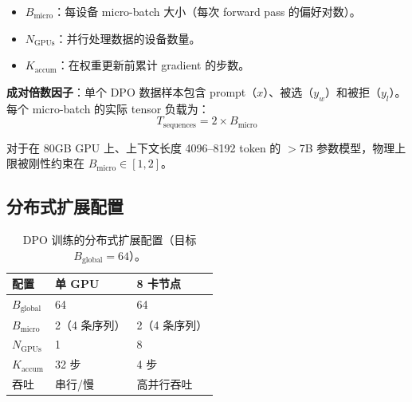 \begin{itemize}
  \item $B_{\text{micro}}$：每设备 micro-batch 大小（每次 forward pass 的偏好对数）。
  \item $N_{\text{GPUs}}$：并行处理数据的设备数量。
  \item $K_{\text{accum}}$：在权重更新前累计 gradient 的步数。
\end{itemize}

\textbf{成对倍数因子}：单个 DPO 数据样本包含 prompt（$x$）、被选（$y_w$）和被拒（$y_l$）。每个 micro-batch 的实际 tensor 负载为：
\begin{equation}
T_{\text{sequences}} = 2 \times B_{\text{micro}}
\end{equation}

对于在 80GB GPU 上、上下文长度 4096--8192 token 的 $>$7B 参数模型，物理上限被刚性约束在 $B_{\text{micro}} \in [1, 2]$。

\subsection{分布式扩展配置}
\label{distributed-scaling-configurations}

\begin{table}[ht!]
\centering\small
\caption{DPO 训练的分布式扩展配置（目标 $B_{\text{global}} = 64$）。}
\begin{tabular}{@{}l l l@{}}
\toprule
\textbf{配置} & \textbf{单 GPU} & \textbf{8 卡节点} \\
\midrule
$B_{\text{global}}$ & 64 & 64 \\
$B_{\text{micro}}$ & 2（4 条序列） & 2（4 条序列） \\
$N_{\text{GPUs}}$ & 1 & 8 \\
$K_{\text{accum}}$ & 32 步 & 4 步 \\
吞吐 & 串行/慢 & 高并行吞吐 \\
\bottomrule
\end{tabular}
\end{table}

